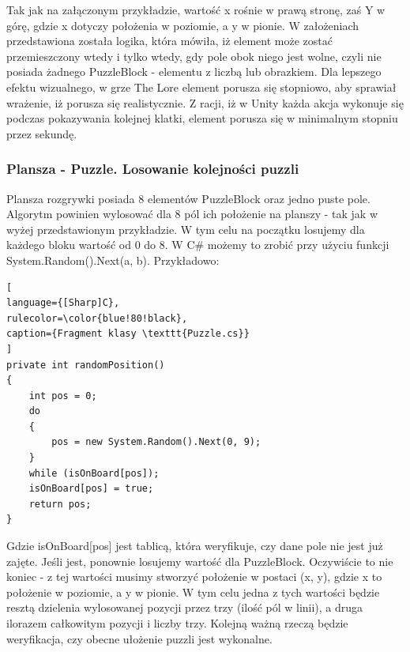 \documentclass[oneside,polski,logo]{amuthesis}
\begin{document}
Tak jak na załączonym przykładzie, wartość x rośnie w prawą stronę, zaś Y w górę, gdzie x dotyczy położenia w poziomie, a y w pionie. W założeniach przedstawiona została logika, która mówiła, iż element może zostać przemieszczony wtedy i tylko wtedy, gdy pole obok niego jest wolne, czyli nie posiada żadnego PuzzleBlock - elementu z liczbą lub obrazkiem. Dla lepszego efektu wizualnego, w grze The Lore element porusza się stopniowo, aby sprawiał wrażenie, iż porusza się realistycznie. Z racji, iż w Unity każda akcja wykonuje się podczas pokazywania kolejnej klatki, element porusza się w minimalnym stopniu przez sekundę. 

\subsubsection{Plansza - Puzzle. Losowanie kolejności puzzli}
Plansza rozgrywki posiada 8 elementów PuzzleBlock oraz jedno puste pole.  Algorytm powinien wylosować dla 8 pól ich położenie na planszy - tak jak w wyżej przedstawionym przykładzie. W tym celu na początku losujemy dla każdego bloku wartość od 0 do 8. W C\# możemy to zrobić przy użyciu funkcji  System.Random().Next(a, b). Przykładowo:
\begin{lstlisting}[
language={[Sharp]C},
rulecolor=\color{blue!80!black},
caption={Fragment klasy \texttt{Puzzle.cs}}
]
private int randomPosition()
{
    int pos = 0;
    do
    {
        pos = new System.Random().Next(0, 9);
    }
    while (isOnBoard[pos]);
    isOnBoard[pos] = true;
    return pos;
}
\end{lstlisting}

Gdzie isOnBoard[pos] jest tablicą, która weryfikuje, czy dane pole nie jest już zajęte. Jeśli jest, ponownie losujemy wartość dla PuzzleBlock. Oczywiście to nie koniec - z tej wartości musimy stworzyć położenie w postaci (x, y), gdzie x to położenie w poziomie, a y w pionie. W tym celu jedna z tych wartości będzie resztą dzielenia wylosowanej pozycji przez trzy (ilość pól w linii), a druga ilorazem całkowitym pozycji i liczby trzy. 
Kolejną ważną rzeczą będzie weryfikacja, czy obecne ułożenie puzzli jest wykonalne.
\end{document}
